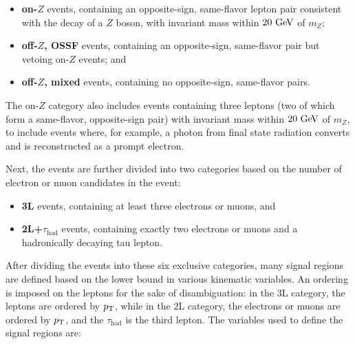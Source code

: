 \begin{itemize}
	\item \textbf{on-$Z$} events, containing an opposite-sign, same-flavor lepton pair consistent with the decay of a $Z$ boson, with invariant mass within $20 \GeV$ of $m_Z$;
	\item \textbf{off-$Z$, OSSF} events, containing an opposite-sign, same-flavor pair but vetoing on-$Z$ events; and
	\item \textbf{off-$Z$, mixed} events, containing no opposite-sign, same-flavor pairs.
\end{itemize}

The on-$Z$ category also includes events containing three leptons (two of which form a same-flavor, opposite-sign pair) with invariant mass within $20 \GeV$ of $m_Z$, to include events where, for example, a photon from final state radiation converts and is reconstructed as a prompt electron.

Next, the events are further divided into two categories based on the number of electron or muon candidates in the event:

\begin{itemize}
	\item \textbf{3L} events, containing at least three electrons or muons, and
	\item \textbf{2L+$\tau_{\mathrm{had}}$} events, containing exactly two electrons or muons and a hadronically decaying tau lepton.
\end{itemize}

After dividing the events into these six exclusive categories, many signal regions are defined based on the lower bound in various kinematic variables. An ordering is imposed on the leptons for the sake of disambiguation: in the 3L category, the leptons are ordered by $p_{\text{T}}$, while in the 2L category, the electrons or muons are ordered by $p_{\text{T}}$, and the $\tau_{\mathrm{had}}$ is the third lepton.  The variables used to define the signal regions are:


